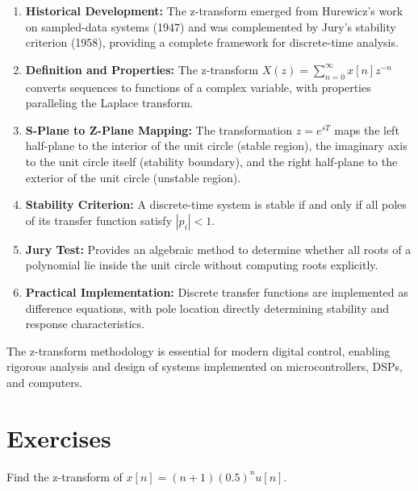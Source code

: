 \begin{enumerate}
    \item \textbf{Historical Development:} The z-transform emerged from Hurewicz's work on sampled-data systems (1947) and was complemented by Jury's stability criterion (1958), providing a complete framework for discrete-time analysis.

    \item \textbf{Definition and Properties:} The z-transform $X(z) = \sum_{n=0}^{\infty} x[n] z^{-n}$ converts sequences to functions of a complex variable, with properties paralleling the Laplace transform.

    \item \textbf{S-Plane to Z-Plane Mapping:} The transformation $z = e^{sT}$ maps the left half-plane to the interior of the unit circle (stable region), the imaginary axis to the unit circle itself (stability boundary), and the right half-plane to the exterior of the unit circle (unstable region).

    \item \textbf{Stability Criterion:} A discrete-time system is stable if and only if all poles of its transfer function satisfy $|p_i| < 1$.

    \item \textbf{Jury Test:} Provides an algebraic method to determine whether all roots of a polynomial lie inside the unit circle without computing roots explicitly.

    \item \textbf{Practical Implementation:} Discrete transfer functions are implemented as difference equations, with pole location directly determining stability and response characteristics.
\end{enumerate}

The z-transform methodology is essential for modern digital control, enabling rigorous analysis and design of systems implemented on microcontrollers, DSPs, and computers.

\newpage
\section{Exercises}

\begin{exercise}
Find the z-transform of $x[n] = (n+1)(0.5)^n u[n]$.
\end{exercise}

